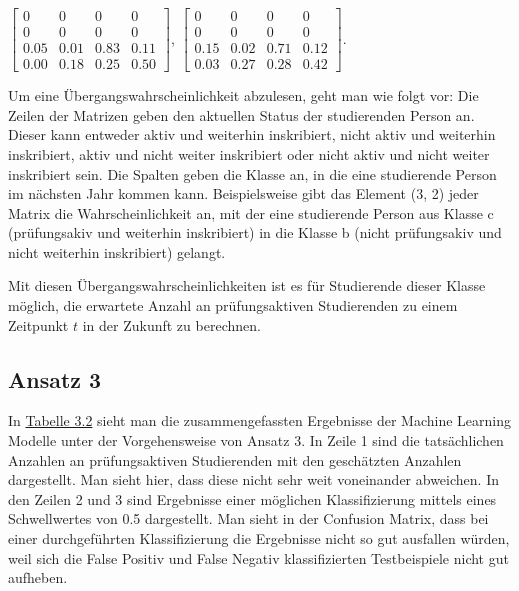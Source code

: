 $\left[ \begin{array}{rrrr} 0 & 0 & 0 & 0 \\  0 & 0 & 0 & 0 \\ 0.05 & 0.01 & 0.83 & 0.11\\ 0.00& 0.18 & 0.25 & 0.50\end{array}\right]$,
$\left[ \begin{array}{rrrr} 0 & 0 & 0 & 0 \\  0 & 0 & 0 & 0 \\ 0.15& 0.02& 0.71& 0.12\\ 0.03& 0.27& 0.28& 0.42 \end{array}\right]$.

Um eine \"Ubergangswahrscheinlichkeit abzulesen, geht man wie folgt vor: Die Zeilen der Matrizen geben den aktuellen Status der studierenden Person an.
Dieser kann entweder \glqq aktiv und weiterhin inskribiert\grqq{}, \glqq nicht aktiv und weiterhin inskribiert\grqq{}, \glqq aktiv und nicht weiter inskribiert\grqq{} oder \glqq nicht aktiv und nicht weiter inskribiert\grqq{} sein.
Die Spalten geben die Klasse an, in die eine studierende Person im n\"achsten Jahr kommen kann. Beispielsweise gibt das Element (3, 2) jeder Matrix die Wahrscheinlichkeit an,
mit der eine studierende Person aus Klasse c (pr\"ufungsakiv und weiterhin inskribiert) in die Klasse b (nicht pr\"ufungsakiv und nicht weiterhin inskribiert) gelangt.


Mit diesen \"Ubergangswahrscheinlichkeiten ist es für Studierende dieser Klasse möglich, die erwartete Anzahl an pr\"ufungsaktiven Studierenden
zu einem Zeitpunkt $t$ in der Zukunft zu berechnen.

\subsection{Ansatz 3}
In \hyperref[tab:ergebnisA3P1]{Tabelle 3.2} sieht man die zusammengefassten Ergebnisse der  Machine Learning Modelle unter der Vorgehensweise von Ansatz 3.
In Zeile 1 sind die tats\"achlichen Anzahlen an pr\"ufungsaktiven Studierenden mit den gesch\"atzten Anzahlen dargestellt. Man sieht hier, dass diese nicht sehr weit voneinander abweichen.
In den Zeilen 2 und 3 sind Ergebnisse einer m\"oglichen Klassifizierung mittels eines Schwellwertes von 0.5 dargestellt. Man sieht in der Confusion Matrix, dass bei einer
durchgef\"uhrten Klassifizierung die Ergebnisse nicht so gut ausfallen w\"urden, weil sich die False Positiv und False Negativ klassifizierten Testbeispiele nicht gut aufheben.

